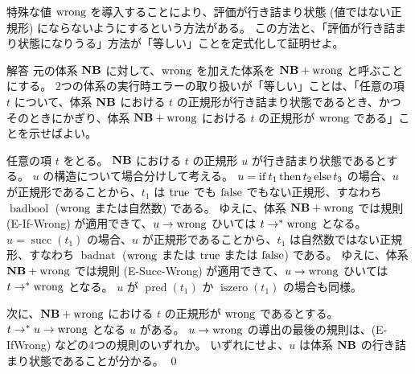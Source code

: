 \begin{jexercise*}[3.5.16]
  特殊な値 $\operatorname{wrong}$ を導入することにより、評価が行き詰まり状態 (値ではない正規形) にならないようにするという方法がある。
  この方法と、「評価が行き詰まり状態になりうる」方法が「等しい」ことを定式化して証明せよ。
\end{jexercise*}
\begin{itembox}[l]{解答}
  元の体系 ${\bf NB}$ に対して、$\operatorname{wrong}$ を加えた体系を ${\bf NB}+\operatorname{wrong}$ と呼ぶことにする。
  2つの体系の実行時エラーの取り扱いが「等しい」ことは、「任意の項 $t$ について、体系 ${\bf NB}$ における $t$ の正規形が行き詰まり状態であるとき、かつそのときにかぎり、体系 ${\bf NB}+\operatorname{wrong}$ における $t$ の正規形が $\operatorname{wrong}$ である」ことを示せばよい。

  任意の項 $t$ をとる。
  ${\bf NB}$ における $t$ の正規形 $u$ が行き詰まり状態であるとする。
  $u$ の構造について場合分けして考える。
  $u = \operatorname{if} t_1 \operatorname{then} t_2 \operatorname{else} t_3$ の場合、$u$ が正規形であることから、$t_1$ は $\operatorname{true}$ でも $\operatorname{false}$ でもない正規形、すなわち $\operatorname{badbool}$ ($\operatorname{wrong}$ または自然数) である。
  ゆえに、体系 ${\bf NB}+\operatorname{wrong}$ では規則 (E-If-Wrong) が適用できて、$u \to \operatorname{wrong}$ ひいては $t \to^* \operatorname{wrong}$ となる。
  $u = \operatorname{succ}(t_1)$ の場合、$u$ が正規形であることから、$t_1$ は自然数ではない正規形、すなわち $\operatorname{badnat}$ ($\operatorname{wrong}$ または $\operatorname{true}$ または $\operatorname{false}$) である。
  ゆえに、体系 ${\bf NB}+\operatorname{wrong}$ では規則 (E-Succ-Wrong) が適用できて、$u \to \operatorname{wrong}$ ひいては $t \to^* \operatorname{wrong}$ となる。
  $u$ が $\operatorname{pred}(t_1)$ か $\operatorname{iszero}(t_1)$ の場合も同様。

  次に、${\bf NB}+\operatorname{wrong}$ における $t$ の正規形が $\operatorname{wrong}$ であるとする。
  $t \to^* u \to \operatorname{wrong}$ となる $u$ がある。
  $u \to \operatorname{wrong}$ の導出の最後の規則は、(E-IfWrong) などの4つの規則のいずれか。
  いずれにせよ、$u$ は体系 ${\bf NB}$ の行き詰まり状態であることが分かる。
  \qed
\end{itembox}

